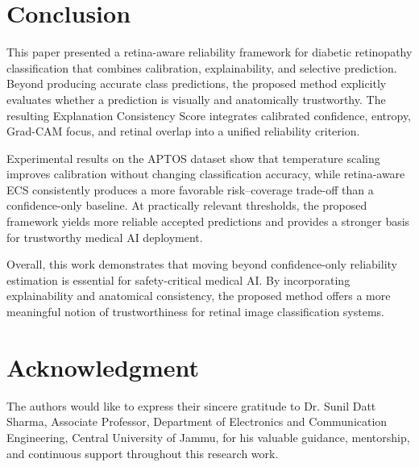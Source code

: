 \documentclass[conference]{IEEEtran}
\begin{document}
\FloatBarrier
\section{Conclusion}
This paper presented a retina-aware reliability framework for diabetic retinopathy classification that combines calibration, explainability, and selective prediction. Beyond producing accurate class predictions, the proposed method explicitly evaluates whether a prediction is visually and anatomically trustworthy. The resulting Explanation Consistency Score integrates calibrated confidence, entropy, Grad-CAM focus, and retinal overlap into a unified reliability criterion.

Experimental results on the APTOS dataset show that temperature scaling improves calibration without changing classification accuracy, while retina-aware ECS consistently produces a more favorable risk--coverage trade-off than a confidence-only baseline. At practically relevant thresholds, the proposed framework yields more reliable accepted predictions and provides a stronger basis for trustworthy medical AI deployment.

Overall, this work demonstrates that moving beyond confidence-only reliability estimation is essential for safety-critical medical AI. By incorporating explainability and anatomical consistency, the proposed method offers a more meaningful notion of trustworthiness for retinal image classification systems.

\section*{Acknowledgment}
The authors would like to express their sincere gratitude to Dr. Sunil Datt Sharma, Associate Professor, Department of Electronics and Communication Engineering, Central University of Jammu, for his valuable guidance, mentorship, and continuous support throughout this research work.



\end{document}
